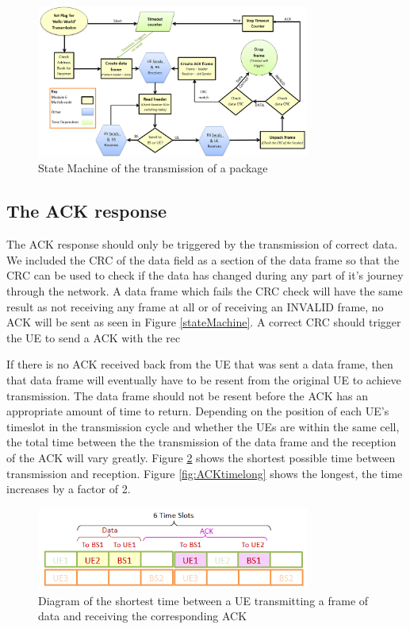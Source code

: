 \begin{figure}[ht]
    \centering
    \includegraphics[width=0.8\textwidth]{State_Machine_yellow.PNG}
    \caption{State Machine of the transmission of a package }
    \label{fig:stateMachine}
\end{figure}

\subsection {The ACK response }
The ACK response should only be triggered by the transmission of correct data. We included the CRC of the data field as a section of the data frame so that the CRC can be used to check if the data has changed during any part of it's journey through the network. A data frame which fails the CRC check will have the same result as not receiving any frame at all or of receiving an INVALID frame, no ACK will be sent as seen in Figure \ref{stateMachine}. A correct CRC should trigger the UE to send a ACK with the rec

If there is no ACK received back from the UE that was sent a data frame, then that data frame will eventually have to be resent from the original UE to achieve transmission. The data frame should not be resent before the ACK has an appropriate amount of time to return. Depending on the position of each UE's timeslot in the transmission cycle and whether the UEs are within the same cell, the total time between the the transmission of the data frame and the reception of the ACK will vary greatly. Figure \ref{fig:ACKtimeshort} shows the shortest possible time between transmission and reception. Figure \ref{fig:ACKtimelong} shows the longest, the time increases by a factor of 2. 
\begin{figure}[ht]
    \centering
    \includegraphics[width=0.8\textwidth]{ACK_timeout_short.PNG}
    \caption{Diagram of the shortest time between a UE transmitting a frame of data and receiving the corresponding ACK}
    \label{fig:ACKtimeshort}
\end{figure}

